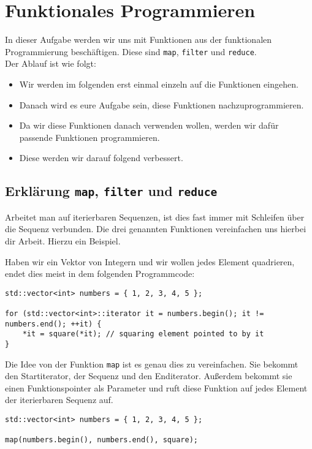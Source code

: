 \section{Funktionales Programmieren}

In dieser Aufgabe werden wir uns mit Funktionen aus der funktionalen Programmierung beschäftigen.
Diese sind \lstinline{map}, \lstinline{filter} und \lstinline{reduce}. \\

Der Ablauf ist wie folgt:
\begin{itemize}
    \item Wir werden im folgenden erst einmal einzeln auf die Funktionen eingehen.
    \item Danach wird es eure Aufgabe sein, diese Funktionen nachzuprogrammieren.
    \item Da wir diese Funktionen danach verwenden wollen, werden wir dafür passende Funktionen programmieren.
    \item Diese werden wir darauf folgend verbessert.
\end{itemize}

\subsection{Erklärung \lstinline{map}, \lstinline{filter} und \lstinline{reduce}}

Arbeitet man auf iterierbaren Sequenzen, ist dies fast immer mit Schleifen über die Sequenz verbunden.
Die drei genannten Funktionen vereinfachen uns hierbei dir Arbeit.
Hierzu ein Beispiel.

Haben wir ein Vektor von Integern und wir wollen jedes Element quadrieren, endet dies meist in dem folgenden Programmcode:

\begin{lstlisting}
std::vector<int> numbers = { 1, 2, 3, 4, 5 };

for (std::vector<int>::iterator it = numbers.begin(); it != numbers.end(); ++it) {
    *it = square(*it); // squaring element pointed to by it
}
\end{lstlisting}

Die Idee von der Funktion \lstinline{map} ist es genau dies zu vereinfachen.
Sie bekommt den Startiterator, der Sequenz und den Enditerator.
Außerdem bekommt sie einen Funktionspointer als Parameter und ruft diese Funktion auf jedes Element der iterierbaren Sequenz auf.

\begin{lstlisting}
std::vector<int> numbers = { 1, 2, 3, 4, 5 };

map(numbers.begin(), numbers.end(), square);
\end{lstlisting}

